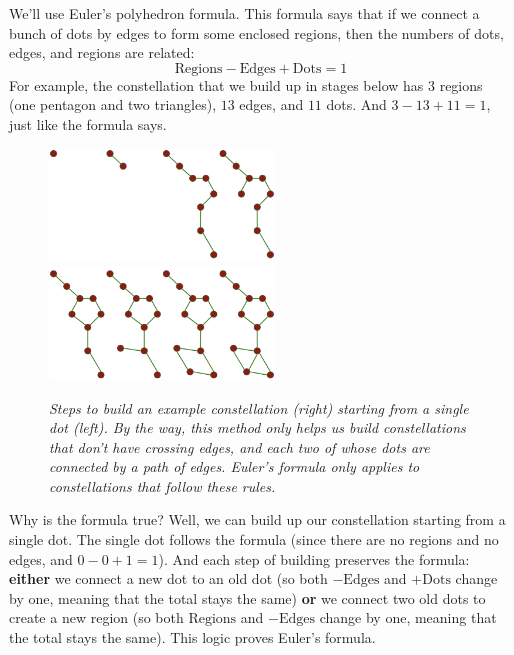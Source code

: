 \documentclass{article}
\begin{document}
            We'll use Euler's polyhedron formula.  This formula says that if we
            connect a bunch of dots by edges to form some enclosed regions,
            then the numbers of dots, edges, and regions are related:
            $$
                \text{Regions} - \text{Edges} + \text{Dots} = 1
            $$
            For example, the constellation that we build up in stages below
            has $3$ regions (one pentagon and two triangles), $13$ edges, and
            $11$ dots.  And $3-13+11 = 1$, just like the formula says.
            \begin{figure}[h!]
                \centering
                \includegraphics[height=3cm]{euler-a}
                \includegraphics[height=3cm]{euler-b}
                \caption{\emph{
                    Steps to build an example constellation (right) starting
                    from a single dot (left).
                    By the way, this method only helps us build constellations
                    that don't have crossing edges, and each two of whose dots
                    are connected by a path of edges.  Euler's formula only
                    applies to constellations that follow these rules.
                }}
            \end{figure}
            Why is the formula true?  Well, we can build up our constellation
            starting from a single dot.  The single dot follows the formula
            (since there are no regions and no edges, and $0-0+1 = 1$).  And
            each step of building preserves the formula:
            \textbf{either} we connect a new dot to an old dot (so both
            $-\text{Edges}$ and $+\text{Dots}$ change by one, meaning that the
            total stays the same)
            \textbf{or} we connect two old dots to create a new region (so both
            $\text{Regions}$ and $-\text{Edges}$ change by one, meaning that
            the total stays the same).  This logic proves Euler's formula. 
\end{document}
